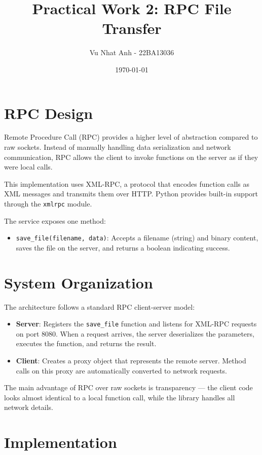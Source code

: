 \documentclass{article}
\title{Practical Work 2: RPC File Transfer}
\author{Vu Nhat Anh - 22BA13036}
\date{\today}
\begin{document}
\maketitle

\section{RPC Design}
Remote Procedure Call (RPC) provides a higher level of abstraction compared to raw sockets. Instead of manually handling data serialization and network communication, RPC allows the client to invoke functions on the server as if they were local calls.

This implementation uses XML-RPC, a protocol that encodes function calls as XML messages and transmits them over HTTP. Python provides built-in support through the \texttt{xmlrpc} module.

The service exposes one method:
\begin{itemize}
    \item \texttt{save\_file(filename, data)}: Accepts a filename (string) and binary content, saves the file on the server, and returns a boolean indicating success.
\end{itemize}

\section{System Organization}
The architecture follows a standard RPC client-server model:
\begin{itemize}
    \item \textbf{Server}: Registers the \texttt{save\_file} function and listens for XML-RPC requests on port 8080. When a request arrives, the server deserializes the parameters, executes the function, and returns the result.
    \item \textbf{Client}: Creates a proxy object that represents the remote server. Method calls on this proxy are automatically converted to network requests.
\end{itemize}

The main advantage of RPC over raw sockets is transparency --- the client code looks almost identical to a local function call, while the library handles all network details.

\section{Implementation}
\end{document}
